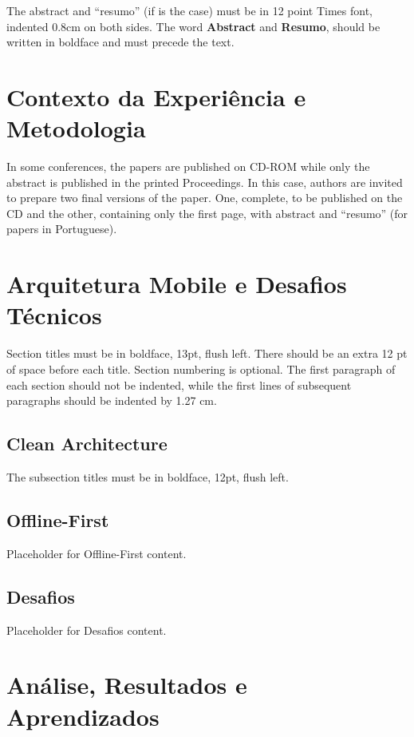 \documentclass[12pt]{article}
\begin{document}
The abstract and ``resumo'' (if is the case) must be in 12 point Times font,
indented 0.8cm on both sides. The word \textbf{Abstract} and \textbf{Resumo},
should be written in boldface and must precede the text.

\section{Contexto da Experiência e Metodologia}

In some conferences, the papers are published on CD-ROM while only the
abstract is published in the printed Proceedings. In this case, authors are
invited to prepare two final versions of the paper. One, complete, to be
published on the CD and the other, containing only the first page, with
abstract and ``resumo'' (for papers in Portuguese).

\section{Arquitetura Mobile e Desafios Técnicos}

Section titles must be in boldface, 13pt, flush left. There should be an extra
12 pt of space before each title. Section numbering is optional. The first
paragraph of each section should not be indented, while the first lines of
subsequent paragraphs should be indented by 1.27 cm.

\subsection{Clean Architecture}

The subsection titles must be in boldface, 12pt, flush left.

\subsection{Offline-First}

Placeholder for Offline-First content.

\subsection{Desafios}

Placeholder for Desafios content.

\section{Análise, Resultados e Aprendizados}
\end{document}
